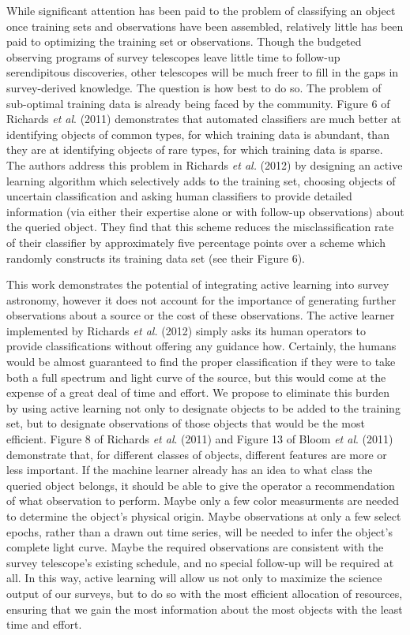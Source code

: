 \documentclass[prd, nofootinbib, floatfix, 12pt,tightenlines]{revtex4}
\begin{document}
While significant attention has been paid to the problem of classifying an
object once training sets and observations have been assembled, relatively
little has been paid to optimizing the training set or observations.
Though the budgeted observing programs of survey telescopes leave little
time to follow-up serendipitous discoveries, other telescopes will be much
freer to fill in the gaps in survey-derived knowledge.  The question is
how best to do so.  The problem of sub-optimal training data is already being
faced by the community.  Figure 6 of Richards {\it et al}. (2011)
demonstrates that automated classifiers are much better at identifying
objects of common types, for which training data is abundant, than they are
at identifying objects of rare types, for which training data is sparse.
The authors address this problem in Richards {\it et al.} (2012) by designing
an active learning algorithm which selectively adds to the training set,
choosing objects of uncertain classification and asking human classifiers to
provide detailed information (via either their expertise alone or with
follow-up observations) about the queried object.  They find that this scheme
reduces the misclassification rate 
of their classifier by approximately five percentage
points over a scheme which randomly constructs its training data set (see
their Figure 6).

This work demonstrates the potential of integrating active
learning into survey astronomy, however it does not 
account for the importance of
generating further 
observations about a source or the cost of these observations.  
The active learner implemented by
Richards {\it et al.} (2012)
simply asks its human operators to provide classifications without offering
any guidance how.  Certainly, the humans would be almost guaranteed to
find the proper classification if they were to take both a full spectrum
and light curve of
the source, but this would come at the expense of a great deal of time and
effort.  We propose to eliminate this burden by using active learning not
only to designate objects to be added to the training set, but to designate
observations of those objects that would be the most efficient.  Figure 8 of
Richards {\it et al}. (2011) and Figure 13 of Bloom {\it et al}. (2011)
demonstrate that, for different classes of objects, different features are
more or less important.  If the machine learner already has an idea to what
class the queried object belongs, it should be able to give the operator a
recommendation of what observation to perform.  Maybe only a few color
measurments are needed to determine the object's physical origin.  
Maybe observations at only a few select epochs, rather than a drawn out time
series, will be needed to infer the object's complete light curve.
Maybe the required observations are consistent with the survey telescope's 
existing schedule, and no special follow-up will be required at all.  In this
way, active learning will allow us not only to maximize the science output of
our surveys, but to do so with the most efficient allocation of resources,
ensuring that we gain the most information about the most objects with the
least time and effort.
\end{document}
